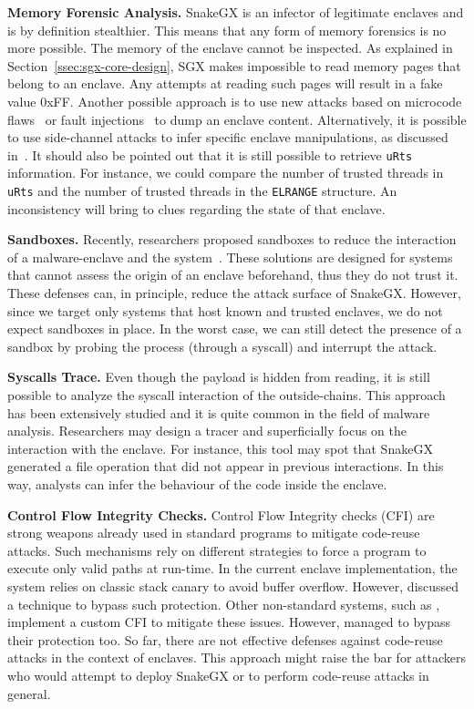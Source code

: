 \textbf{Memory Forensic Analysis.}
SnakeGX is an infector of legitimate enclaves and is by definition 
stealthier.
This means that any form of memory forensics is no more possible. The memory of 
the enclave cannot be inspected. As explained in 
Section~\ref{ssec:sgx-core-design},
SGX makes impossible to read memory pages that belong to an enclave.
Any attempts at reading such pages will result in a fake value $0$xFF.
Another possible approach is to use new attacks based on 
microcode flaws~\citep{foreshadow} or fault 
injections~\citep{Murdock2019plundervolt} to dump an enclave content.
Alternatively, it is possible to use side-channel attacks to 
infer specific enclave manipulations, as discussed in~\citep{216033}.
It should also be pointed out that it is still possible to retrieve 
\texttt{uRts} information.
For instance, we could compare the number of trusted threads in \texttt{uRts} 
and 
the number of trusted threads in the \texttt{ELRANGE} structure.
An inconsistency will bring to clues regarding the state of that enclave.

\textbf{Sandboxes.}
Recently, researchers proposed sandboxes to reduce the 
interaction of a malware-enclave and the system~\citep{sgxjail}.
These solutions are designed for systems that cannot assess the 
origin of an enclave beforehand, thus they do not trust it.
These defenses can, in principle, reduce the attack surface of SnakeGX.
However, since we target only systems that host known and trusted enclaves, we 
do not expect sandboxes in place.
In the worst case, we can still detect the presence of a sandbox by probing the 
process (\ie through a syscall) and interrupt the attack.

\textbf{Syscalls Trace.}
Even though the payload is hidden from reading,
it is still possible to analyze the syscall interaction of the outside-chains.
This approach has been extensively studied and it is quite common in the field 
of malware analysis.
Researchers may design a tracer and superficially focus on the interaction with 
the enclave.
For instance, this tool may spot that SnakeGX generated a file operation that 
did not appear in previous interactions. In this way, analysts can infer the 
behaviour of the code inside the enclave.

\textbf{Control Flow Integrity Checks.}
Control Flow Integrity checks (CFI) are strong weapons already used
in standard programs to mitigate code-reuse attacks.
Such mechanisms rely on different strategies to force a program to execute only 
valid paths at run-time.
In the current enclave implementation, the system relies on
classic stack canary to avoid buffer overflow.
However, \cite{lee2017hacking} discussed a technique to bypass such protection.
Other non-standard systems, such as \cite{seo2017sgx}, implement a custom CFI 
to mitigate these
issues.
However, \cite{biondo2018guard} managed to bypass their protection too.
So far, there are not effective defenses against code-reuse attacks in the 
context of enclaves.
This approach might raise the bar for attackers who would attempt to deploy 
SnakeGX or to perform code-reuse attacks in general.

